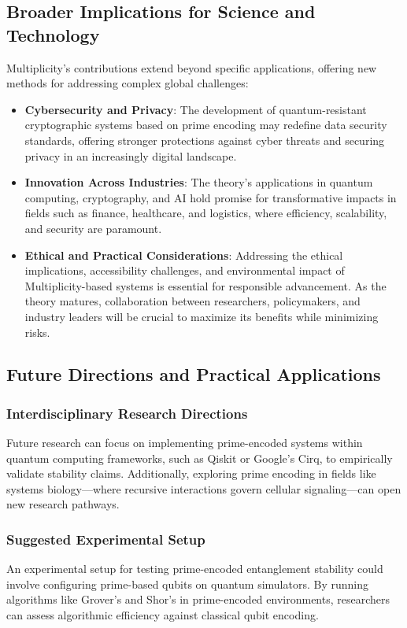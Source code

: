 \documentclass{article}
\theoremstyle{plain}
\begin{document}
\begin{enumerate}
\subsection{Broader Implications for Science and Technology}

Multiplicity’s contributions extend beyond specific applications, offering new methods for addressing complex global challenges:

\begin{itemize}
    \item \textbf{Cybersecurity and Privacy}: The development of quantum-resistant cryptographic systems based on prime encoding may redefine data security standards, offering stronger protections against cyber threats and securing privacy in an increasingly digital landscape.
    
    \item \textbf{Innovation Across Industries}: The theory’s applications in quantum computing, cryptography, and AI hold promise for transformative impacts in fields such as finance, healthcare, and logistics, where efficiency, scalability, and security are paramount.
    
    \item \textbf{Ethical and Practical Considerations}: Addressing the ethical implications, accessibility challenges, and environmental impact of Multiplicity-based systems is essential for responsible advancement. As the theory matures, collaboration between researchers, policymakers, and industry leaders will be crucial to maximize its benefits while minimizing risks.
\end{itemize}

\subsection{Future Directions and Practical Applications}
\subsubsection{Interdisciplinary Research Directions}
Future research can focus on implementing prime-encoded systems within quantum computing frameworks, such as Qiskit or Google’s Cirq, to empirically validate stability claims. Additionally, exploring prime encoding in fields like systems biology—where recursive interactions govern cellular signaling—can open new research pathways.

\subsubsection{Suggested Experimental Setup}
An experimental setup for testing prime-encoded entanglement stability could involve configuring prime-based qubits on quantum simulators. By running algorithms like Grover’s and Shor’s in prime-encoded environments, researchers can assess algorithmic efficiency against classical qubit encoding.


\end{enumerate}
\end{document}
